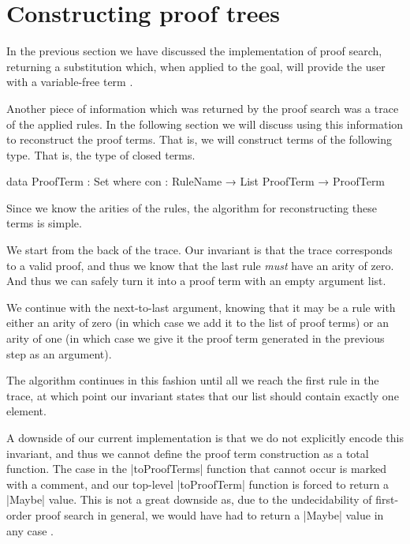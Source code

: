 \documentclass[preprint]{sigplanconf}
\begin{document}
\section{Constructing proof trees}
\label{sec:proofs}

In the previous section we have discussed the implementation of proof
search, returning a substitution which, when applied to the goal, will
provide the user with a variable-free term .

Another piece of information which was returned by the proof search
was a trace of the applied rules. In the following section we will
discuss using this information to reconstruct the proof terms. That
is, we will construct terms of the following type. That is, the type
of closed terms.

\begin{code}
data ProofTerm : Set where
  con : RuleName → List ProofTerm → ProofTerm
\end{code}

Since we know the arities of the rules, the algorithm for
reconstructing these terms is simple.

We start from the back of the trace. Our invariant is that the trace
corresponds to a valid proof, and thus we know that the last rule
\emph{must} have an arity of zero. And thus we can safely turn it into
a proof term with an empty argument list.

We continue with the next-to-last argument, knowing that it may be a
rule with either an arity of zero (in which case we add it to the list
of proof terms) or an arity of one (in which case we give it the
proof term generated in the previous step as an argument).

The algorithm continues in this fashion until all we reach the first
rule in the trace, at which point our invariant states that our list
should contain exactly one element.

A downside of our current implementation is that we do not explicitly
encode this invariant, and thus we cannot define the proof term
construction as a total function. The case in the |toProofTerms|
function that cannot occur is marked with a comment, and our top-level
|toProofTerm| function is forced to return a |Maybe| value. This is
not a great downside as, due to the undecidability of first-order
proof search in general, we would have had to return a |Maybe| value
in any case .
\end{document}
